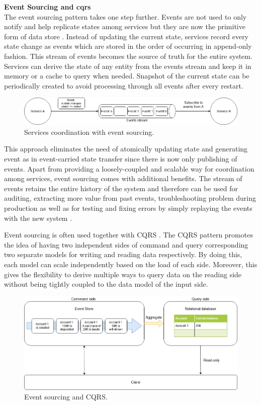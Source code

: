 \textbf{Event Sourcing and \acrfull{cqrs}}\\
The event sourcing pattern takes one step further. Events are not used to only notify and help replicate states among services but they are now the primitive form of data store \cite{eventsourcingfowler}. Instead of updating the current state, services record every state change as events which are stored in the order of occurring in append-only fashion. This stream of events becomes the source of truth for the entire system. Services can derive the state of any entity from the events stream and keep it in memory or a cache to query when needed. Snapshot of the current state can be periodically created to avoid processing through all events after every restart.

\begin{figure}[h]
	\includegraphics[width=\linewidth]{images/eventsourcing.png}
	\caption{Services coordination with event sourcing.}
	\label{fig:eventsourcing}
\end{figure}

This approach eliminates the need of atomically updating state and generating event as in event-carried state transfer since there is now only publishing of events. Apart from providing a loosely-coupled and scalable way for coordination among services, event sourcing comes with additional benefits. The stream of events retains the entire history of the system and therefore can be used for auditing, extracting more value from past events, troubleshooting problem during production as well as for testing and fixing errors by simply replaying the events with the new system \cite{betts2013exploring}. 

Event sourcing is often used together with CQRS \cite{cqrsgregyoung}. The CQRS pattern promotes the idea of having two independent sides of command and query corresponding two separate models for writing and reading data respectively. By doing this, each model can scale independently based on the load of each side. Moreover, this gives the flexibility to derive multiple ways to query data on the reading side without being tightly coupled to the data model of the input side. 

\begin{figure}[h]
	\includegraphics[width=\linewidth]{images/cqrs.png}
	\caption{Event sourcing and CQRS.}
	\label{fig:cqrs}
\end{figure}


